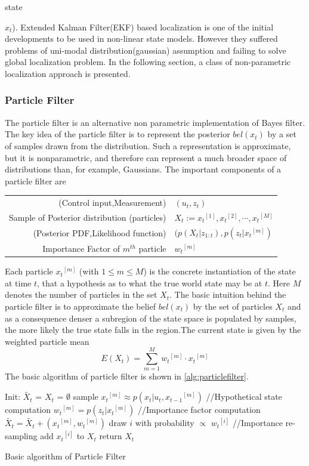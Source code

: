 state {$x_t$). Extended Kalman Filter(EKF) based localization is one of the initial developments to be used in non-linear state models. However they suffered problems of uni-modal distribution(gaussian) assumption and failing to solve global localization problem. In the following section, a class of non-parametric localization approach is presented. 
\subsubsection{Particle Filter}
\label{ssec:particlefilter}
	The particle filter\cite{thrun2005probabilistic} is an alternative non parametric implementation of Bayes filter. The key idea of the particle filter is to represent the posterior $bel(x_t)$ by a set of samples drawn from the distribution. Such a representation is approximate, but it is nonparametric, and therefore can represent a much broader space of distributions than, for example, Gaussians. The important components of a particle filter are\\
\begin{tabular}{r l}
\centering
  (Control input,Measurement) & $(u_t,z_t)$ \\ 
  Sample of Posterior distribution (particles) & $X_t := {x_t}^{[1]},{x_t}^{[2]},\cdots,{x_t}^{[M]}$ \\
  (Posterior PDF,Likelihood function) & $(p(X_t\vert z_{1:t}),p(z_t \vert {x_t}^{[m]})$ \\
  Importance Factor of $m^{th}$ particle & ${w_t}^{[m]}$ \\
\end{tabular}
	
	Each particle ${x_t}^{[m]}$ (with $1 \leq m \leq M$) is the concrete instantiation of the state at time $t$, that a hypothesis as to what the true world state may be at $t$. Here $M$ denotes the number of particles in the set $X_t$. The basic intuition behind the particle filter is to approximate the belief $bel(x_t)$ by the set of particles $X_t$ and as a consequence denser a subregion of the state space is populated by samples, the more likely the true state falls in the region.The current state is given by the weighted particle mean 
\begin{equation}
E(X_t) = \sum_{m=1}^{M} {w_t}^{[m]}\cdot {x_t}^{[m]}
\end{equation}
The basic algorithm of particle filter is shown in \ref{alg:particlefilter}.\\ 
\begin{algorithm}
Init: {$\tilde{X_t}$ = $X_t$ = $\emptyset$ } \;
  { 
   sample ${x_t}^{[m]} \approx p(x_t \vert u_t,{x_{t-1}}^{[m]}) $ //Hypothetical state computation \;
   ${w_t}^{[m]} = p(z_t \vert {x_t}^{[m]} )$ //Importance factor computation\;
   $\tilde{X_t} = \tilde{X_t} + ({x_t}^{[m]},{w_t}^{[m]})$ \;
 }
  { 
   draw $i$ with probability $\varpropto$ ${w_t}^{[i]}$ //Importance re-sampling\;
   add ${x_t}^{[i]}$ to $X_t$ \;
 }
 return $X_t$
 \caption{Basic algorithm of Particle Filter}
 \label{alg:particlefilter}
\end{algorithm}
}
